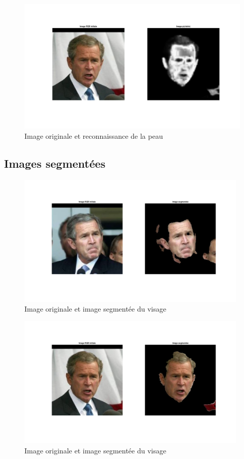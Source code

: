 \documentclass[11pt,a4paper]{article}
\begin{document}
\begin{figure}[H]
\center
\includegraphics[width=15cm]{exo2_skin3.png}
\caption{Image originale et reconnaissance de la peau}

\end{figure}

\subsection{Images segmentées}
\label{an.seg}

\begin{figure}[H]
\center
\includegraphics[width=11cm]{exo2_image_seg2.png}
\caption{Image originale et image segmentée du visage}
\end{figure} 

\begin{figure}[H]
\center
\includegraphics[width=11cm]{exo2_image_seg3.png}
\caption{Image originale et image segmentée du visage}
\end{figure} 
\end{document}
